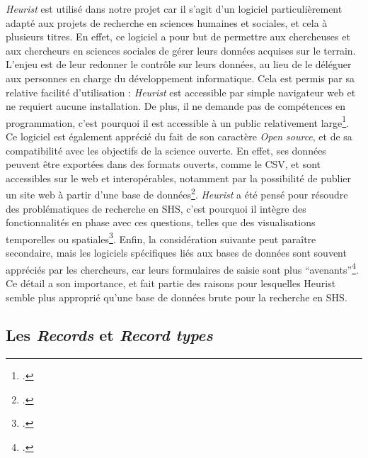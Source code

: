 \emph{Heurist} est utilisé dans notre projet car il s'agit d'un logiciel particulièrement adapté aux projets de recherche en sciences humaines et sociales, et cela à plusieurs titres. En effet, ce logiciel a pour but de permettre aux chercheuses et aux chercheurs en sciences sociales de gérer leurs données acquises sur le terrain. L'enjeu est de leur redonner le contrôle sur leurs données, au lieu de le déléguer aux personnes en charge du développement informatique. Cela est permis par sa relative facilité d'utilisation : \emph{Heurist} est accessible par simple navigateur web et ne requiert aucune installation. De plus, il ne demande pas de compétences en programmation, c'est pourquoi il est accessible à un public relativement  large\footcite{huma-num_heurist_2026}. Ce logiciel est également apprécié du fait de son caractère \emph{Open source}, et de sa compatibilité avec les objectifs de la science ouverte. En effet, ses données peuvent être exportées dans des formats ouverts, comme le CSV, et sont accessibles sur le web et interopérables, notamment par la possibilité de publier un site web à partir d'une base de données\footcite{paillusson_introduction_2022}. 
\emph{Heurist} a été pensé pour résoudre des problématiques de recherche en SHS, c'est pourquoi il intègre des fonctionnalités en phase avec ces questions, telles que des visualisations temporelles ou spatiales\footcite{paillusson_introduction_2022}. 
Enfin, la considération suivante peut paraître secondaire, mais les logiciels spécifiques liés aux bases de données sont souvent appréciés par les chercheurs, car leurs formulaires de saisie sont plus \enquote{avenants}\footcite[Voir \enquote{Tableur ou gestionnaire de bases de données ?}]{Lemercier_Zalc_2008}. Ce détail a son importance, et fait partie des raisons pour lesquelles Heurist semble plus approprié qu'une base de données brute pour la recherche en SHS. 

\subsection{Les \emph{Records} et \emph{Record types}}

